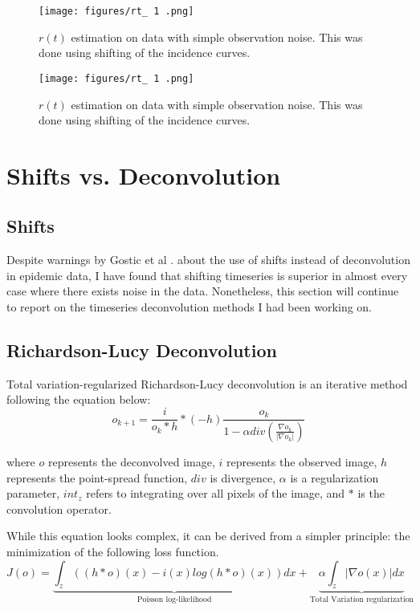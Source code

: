 \documentclass{article}
\begin{document}
\begin{figure}[h!]
    \centering
    \texttt{[image: figures/rt\_ 1 .png]}
    \caption{$r(t)$ estimation on data with simple observation noise. This was done using shifting of the incidence curves.}
\end{figure}

\clearpage
\begin{figure}[h!]
    \centering
    \texttt{[image: figures/rt\_ 1 .png]}
    \caption{$r(t)$ estimation on data with simple observation noise. This was done using shifting of the incidence curves.}
\end{figure}


\section{Shifts vs. Deconvolution}

\subsection{Shifts}
Despite warnings by Gostic et al \cite{Gostic}. about the use of shifts instead of deconvolution in epidemic data, I have found that shifting timeseries is superior in almost every case where there exists noise in the data. Nonetheless, this section will continue to report on the timeseries deconvolution methods I had been working on.


\subsection{Richardson-Lucy Deconvolution}
Total variation-regularized Richardson-Lucy deconvolution is an iterative method following the equation below: \cite{RLLoss}
\begin{equation}
    o_{k+1} = \frac{i}{o_k * h} * (-h) \frac{o_k}{1-\alpha div(\frac{\nabla o_k}{|\nabla o_k|})}
\end{equation}

where $o$ represents the deconvolved image, $i$ represents the observed image, $h$ represents the point-spread function, $div$ is divergence, $\alpha$ is a regularization parameter, $int_z$ refers to integrating over all pixels of the image, and $*$ is the convolution operator.

While this equation looks complex, it can be derived from a simpler principle: the minimization of the following loss function. 
\begin{equation}
    J(o) = \underbrace{\int_z ((h*o)(x) - i(x) log(h*o)(x))dx}_{\mbox{Poisson log-likelihood}} + \underbrace{\alpha \int_z |\nabla o(x)| dx}_{\mbox{Total Variation regularization}}
\end{equation}
\end{document}
